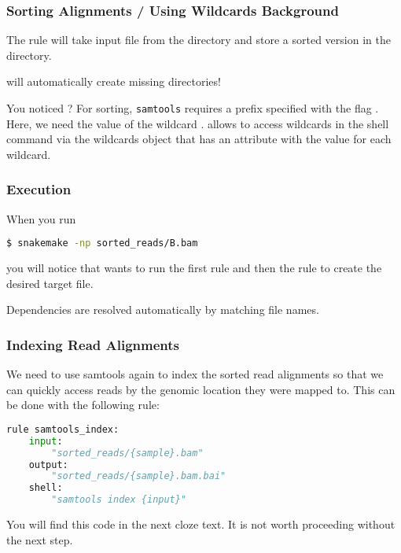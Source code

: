 \begin{frame}[fragile]
  \frametitle{Sorting Alignments / Using Wildcards Background}
  The rule will take  input file from the  directory and store a sorted version in the  directory.
  \pause
  \begin{docs}
  	\Snakemake{} will automatically create missing directories!
  \end{docs}
  You noticed ? 
  \pause
  For sorting, \texttt{samtools} requires a prefix specified with the flag . Here, we need the value of the wildcard . \Snakemake{} allows to access wildcards in the shell command via the wildcards object that has an attribute with the value for each wildcard.
\end{frame}

\begin{frame}[fragile]
  \frametitle{Execution}
  When you run 
  \begin{lstlisting}[language=Bash, style=Shell]
$ snakemake -np sorted_reads/B.bam
  \end{lstlisting}
  you will notice that \Snakemake{} wants to run the first rule  and then the rule  to create the desired target file.
  \begin{docs}
  	Dependencies are resolved automatically by matching file names.
  \end{docs}
\end{frame}

\begin{frame}[fragile]
  \frametitle{Indexing Read Alignments}
  We need to use samtools again to index the sorted read alignments so that we can quickly access reads by the genomic location they were mapped to. This can be done with the following rule:
  \begin{lstlisting}[language=Python,style=Python]
rule samtools_index:
    input:
        "sorted_reads/{sample}.bam"
    output:
        "sorted_reads/{sample}.bam.bai"
    shell:
        "samtools index {input}"
  \end{lstlisting}
  \begin{hint}[Note]
  	You will find this code in the next cloze text. It is not worth proceeding without the next step.
  \end{hint}
\end{frame}

